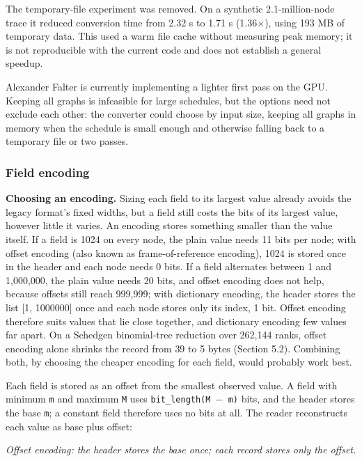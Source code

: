 \documentclass[10pt,a4paper]{article}
\begin{document}
The temporary-file experiment was removed. On a synthetic 2.1-million-node trace it reduced conversion time from 2.32 s to 1.71 s (1.36\(\times\)), using 193 MB of temporary data. This used a warm file cache without measuring peak memory; it is not reproducible with the current code and does not establish a general speedup.

Alexander Falter is currently implementing a lighter first pass on the GPU. Keeping all graphs is infeasible for large schedules, but the options need not exclude each other: the converter could choose by input size, keeping all graphs in memory when the schedule is small enough and otherwise falling back to a temporary file or two passes.

\hypertarget{field-encoding}{}
\subsubsection{Field encoding}

\textbf{Choosing an encoding.} Sizing each field to its largest value already avoids the legacy format's fixed widths, but a field still costs the bits of its largest value, however little it varies. An encoding stores something smaller than the value itself. If a field is 1024 on every node, the plain value needs 11 bits per node; with offset encoding (also known as frame-of-reference encoding), 1024 is stored once in the header and each node needs 0 bits. If a field alternates between 1 and 1,000,000, the plain value needs 20 bits, and offset encoding does not help, because offsets still reach 999,999; with dictionary encoding, the header stores the list [1, 1000000] once and each node stores only its index, 1 bit. Offset encoding therefore suits values that lie close together, and dictionary encoding few values far apart. On a Schedgen binomial-tree reduction over 262,144 ranks, offset encoding alone shrinks the record from 39 to 5 bytes (Section 5.2). Combining both, by choosing the cheaper encoding for each field, would probably work best.

Each field is stored as an offset from the smallest observed value. A field with minimum \texttt{m} and maximum \texttt{M} uses \texttt{bit\_\allowbreak{}length(M \(-\) m\allowbreak{})} bits, and the header stores the base \texttt{m}; a constant field therefore uses no bits at all. The reader reconstructs each value as base plus offset:

\begin{center}
\resizebox{0.8\linewidth}{!}{}
\par\nopagebreak\small\itshape Offset encoding: the header stores the base once; each record stores only the offset.
\end{center}
\end{document}
